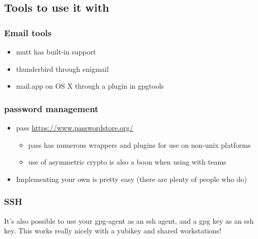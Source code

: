 \documentclass[aspectratio=1610,bigger,utf8]{beamer}
\begin{document}
\subsection{Tools to use it with}
\begin{frame}
	\frametitle{Email tools}
	\begin{itemize}
		\item mutt has built-in support
		\item thunderbird through enigmail
		\item mail.app on OS X through a plugin in gpgtools
	\end{itemize}
\end{frame}
\begin{frame}
	\frametitle{password management}
	\begin{itemize}
		\item pass \url{https://www.passwordstore.org/}
			\begin{itemize}
				\item pass has numerous wrappers and plugins
					for use on non-unix platforms
				\item use of asymmetric crypto is also a boon
					when using with teams
			\end{itemize}
		\item Implementing your own is pretty easy (there are plenty of
			people who do)
	\end{itemize}
\end{frame}
\begin{frame}
	\frametitle{SSH}
	It's also possible to use your gpg-agent as an ssh agent, and a gpg key
	as an ssh key. This works really nicely with a yubikey and shared
	workstations!
\end{frame}
 
\end{document}
